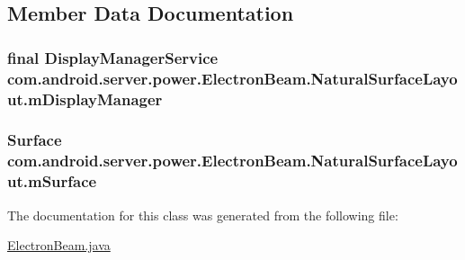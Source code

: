 \subsection{Member Data Documentation}
\hypertarget{classcom_1_1android_1_1server_1_1power_1_1ElectronBeam_1_1NaturalSurfaceLayout_a5b437ab809caf97d241478ce52c6c932}{
\subsubsection[{m\-Display\-Manager}]{\setlength{\rightskip}{0pt plus 5cm}final Display\-Manager\-Service com.\-android.\-server.\-power.\-Electron\-Beam.\-Natural\-Surface\-Layout.\-m\-Display\-Manager\hspace{0.3cm}{\ttfamily [private]}}}\label{classcom_1_1android_1_1server_1_1power_1_1ElectronBeam_1_1NaturalSurfaceLayout_a5b437ab809caf97d241478ce52c6c932}
\hypertarget{classcom_1_1android_1_1server_1_1power_1_1ElectronBeam_1_1NaturalSurfaceLayout_abb69c08305d023474da59b30206b8fd8}{
\subsubsection[{m\-Surface}]{\setlength{\rightskip}{0pt plus 5cm}Surface com.\-android.\-server.\-power.\-Electron\-Beam.\-Natural\-Surface\-Layout.\-m\-Surface\hspace{0.3cm}{\ttfamily [private]}}}\label{classcom_1_1android_1_1server_1_1power_1_1ElectronBeam_1_1NaturalSurfaceLayout_abb69c08305d023474da59b30206b8fd8}


The documentation for this class was generated from the following file\-:\begin{DoxyCompactItemize}
\item 
\hyperlink{ElectronBeam_8java}{Electron\-Beam.\-java}\end{DoxyCompactItemize}

